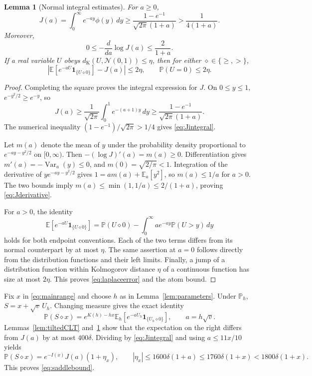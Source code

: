 \documentclass[11pt]{article}
\numberwithin{equation}{section}
\newtheorem{lemma}[theorem]{Lemma}
\theoremstyle{remark}
\newcommand{\E}{\mathbb E}
\newcommand{\Pp}{\mathbb P}
\newcommand{\ind}{\mathbf 1}
\newcommand{\Var}{\operatorname{Var}}
\newcommand{\dK}{d_{\mathrm K}}
\newcommand{\Normal}{\mathcal N(0,1)}
\begin{document}
\begin{lemma}[Normal integral estimates]\label{lem:J}
For $a\ge0$,
\begin{equation}\label{eq:Jintegral}
 J(a)=\int_0^\infty e^{-ay}\phi(y)\,dy
 \ge\frac{1-e^{-1}}{\sqrt{2\pi}(1+a)}
 >\frac1{4(1+a)}.
\end{equation}
Moreover,
\begin{equation}\label{eq:Jderivative}
 0\le-\frac{d}{da}\log J(a)\le\frac2{1+a}.
\end{equation}
If a real variable $U$ obeys $\dK(U,\Normal)\le\eta$, then for either
$\diamond\in\{\ge,>\}$,
\begin{equation}\label{eq:laplaceerror}
 \left|\E[e^{-aU}\ind_{\{U\diamond0\}}]-J(a)\right|\le2\eta,
 \qquad \Pp(U=0)\le2\eta.
\end{equation}
\end{lemma}
\begin{proof}
Completing the square proves the integral expression for $J$. On $0\le y\le1$,
$e^{-y^2/2}\ge e^{-y}$, so
\[
 J(a)\ge\frac1{\sqrt{2\pi}}\int_0^1e^{-(a+1)y}\,dy
 \ge\frac{1-e^{-1}}{\sqrt{2\pi}(1+a)}.
\]
The numerical inequality $(1-e^{-1})/\sqrt{2\pi}>1/4$ gives
\eqref{eq:Jintegral}.

Let $m(a)$ denote the mean of $y$ under the probability density proportional
to $e^{-ay-y^2/2}$ on $[0,\infty)$. Then
$-(\log J)'(a)=m(a)\ge0$. Differentiation gives
$m'(a)=-\Var_a(y)\le0$, and $m(0)=\sqrt{2/\pi}<1$.
Integration of the derivative of $y e^{-ay-y^2/2}$ gives
$1=a m(a)+\E_a[y^2]$, so $m(a)\le1/a$ for $a>0$.
The two bounds imply $m(a)\le\min(1,1/a)\le2/(1+a)$, proving
\eqref{eq:Jderivative}.

For $a>0$, the identity
\[
 \E[e^{-aU}\ind_{\{U\diamond0\}}]
 =\Pp(U\diamond0)
   -\int_0^\infty a e^{-ay}\Pp(U>y)\,dy
\]
holds for both endpoint conventions. Each of the two terms differs from
its normal counterpart by at most $\eta$. The same assertion at $a=0$
follows directly from the distribution functions and their left limits.
Finally, a jump of a distribution function within Kolmogorov distance
$\eta$ of a continuous function has size at most $2\eta$. This proves
\eqref{eq:laplaceerror} and the atom bound.
\end{proof}

Fix $x$ in \eqref{eq:mainrange} and choose $h$ as in
Lemma~\ref{lem:parameters}. Under $\Pp_h$, $S=x+\sqrt v\,U_h$.
Changing measure gives the exact identity
\begin{equation}\label{eq:undoexact}
 \Pp(S\diamond x)
 =e^{K(h)-hx}\E_h[e^{-aU_h}\ind_{\{U_h\diamond0\}}],
 \qquad a=h\sqrt v.
\end{equation}
Lemmas~\ref{lem:tiltedCLT} and~\ref{lem:J} show that the expectation on
the right differs from $J(a)$ by at most $400\delta$. Dividing by
\eqref{eq:Jintegral} and using $a\le11x/10$ yields
\begin{equation}\label{eq:etabound}
 \Pp(S\diamond x)=e^{-I(x)}J(a)(1+\eta_x),
 \qquad |\eta_x|\le1600\delta(1+a)
 \le1760\delta(1+x)<1800\delta(1+x).
\end{equation}
This proves \eqref{eq:saddlebound}.
\end{document}
